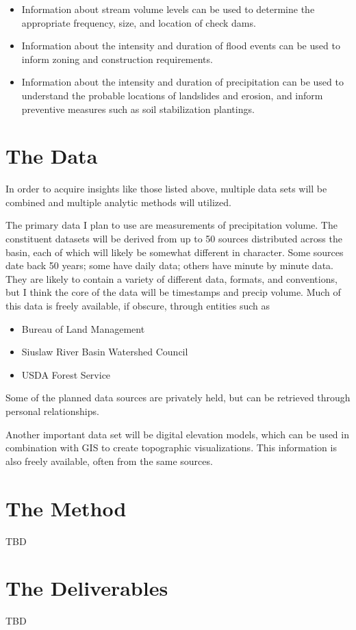 \documentclass[]{article}
\providecommand{\tightlist}{%
  \setlength{\itemsep}{0pt}\setlength{\parskip}{0pt}}
\begin{document}
\begin{itemize}
\tightlist
\item
  Information about stream volume levels can be used to determine the
  appropriate frequency, size, and location of check dams.
\item
  Information about the intensity and duration of flood events can be
  used to inform zoning and construction requirements.
\item
  Information about the intensity and duration of precipitation can be
  used to understand the probable locations of landslides and erosion,
  and inform preventive measures such as soil stabilization plantings.
\end{itemize}

\section{The Data}\label{the-data}

In order to acquire insights like those listed above, multiple data sets
will be combined and multiple analytic methods will utilized.

The primary data I plan to use are measurements of precipitation volume.
The constituent datasets will be derived from up to 50 sources
distributed across the basin, each of which will likely be somewhat
different in character. Some sources date back 50 years; some have daily
data; others have minute by minute data. They are likely to contain a
variety of different data, formats, and conventions, but I think the
core of the data will be timestamps and precip volume. Much of this data
is freely available, if obscure, through entities such as

\begin{itemize}
\tightlist
\item
  Bureau of Land Management
\item
  Siuslaw River Basin Watershed Council
\item
  USDA Forest Service
\end{itemize}

Some of the planned data sources are privately held, but can be
retrieved through personal relationships.

Another important data set will be digital elevation models, which can
be used in combination with GIS to create topographic visualizations.
This information is also freely available, often from the same sources.

\section{The Method}\label{the-method}

TBD

\section{The Deliverables}\label{the-deliverables}

TBD
\end{document}
